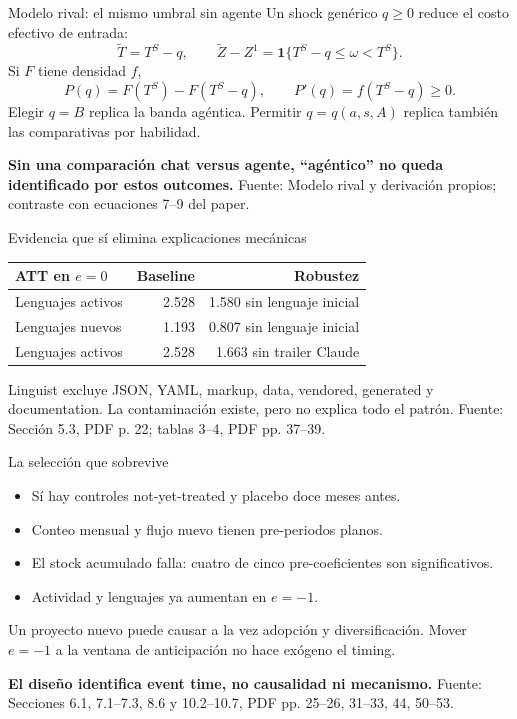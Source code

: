 \documentclass[aspectratio=169,11pt]{beamer}
\newcommand{\source}[1]{\vfill{\color{Gray}\tiny Fuente: #1}}
\newcommand{\key}[1]{{\color{Coral}\bfseries #1}}
\begin{document}
\begin{frame}{Modelo rival: el mismo umbral sin agente}
  Un shock genérico \(q\ge0\) reduce el costo efectivo de entrada:
  \[
  \widetilde T=T^S-q,
  \qquad \widetilde Z-Z^1=\mathbf1\{T^S-q\le\omega<T^S\}.
  \]
  Si \(F\) tiene densidad \(f\),
  \[
  P(q)=F(T^S)-F(T^S-q),\qquad P'(q)=f(T^S-q)\ge0.
  \]
  Elegir \(q=B\) replica la banda agéntica. Permitir \(q=q(a,s,A)\) replica también las comparativas por habilidad.

  \vspace{0.35cm}
  \key{Sin una comparación chat versus agente, “agéntico” no queda identificado por estos outcomes.}
  \source{Modelo rival y derivación propios; contraste con ecuaciones 7--9 del paper.}
\end{frame}

\begin{frame}{Evidencia que sí elimina explicaciones mecánicas}
  \centering
  \begin{tabular}{lrr}
    \toprule
    ATT en \(e=0\) & Baseline & Robustez \\
    \midrule
    Lenguajes activos & 2.528 & 1.580 sin lenguaje inicial \\
    Lenguajes nuevos & 1.193 & 0.807 sin lenguaje inicial \\
    Lenguajes activos & 2.528 & 1.663 sin trailer Claude \\
    \bottomrule
  \end{tabular}

  \vspace{0.65cm}
  Linguist excluye JSON, YAML, markup, data, vendored, generated y documentation. La contaminación existe, pero no explica todo el patrón.
  \source{Sección 5.3, PDF p. 22; tablas 3--4, PDF pp. 37--39.}
\end{frame}

\begin{frame}{La selección que sobrevive}
  \begin{itemize}
    \item Sí hay controles not-yet-treated y placebo doce meses antes.
    \item Conteo mensual y flujo nuevo tienen pre-periodos planos.
    \item El stock acumulado falla: cuatro de cinco pre-coeficientes son significativos.
    \item Actividad y lenguajes ya aumentan en \(e=-1\).
  \end{itemize}
  \vspace{0.35cm}
  Un proyecto nuevo puede causar a la vez adopción y diversificación. Mover \(e=-1\) a la ventana de anticipación no hace exógeno el timing.

  \vspace{0.35cm}
  \key{El diseño identifica event time, no causalidad ni mecanismo.}
  \source{Secciones 6.1, 7.1--7.3, 8.6 y 10.2--10.7, PDF pp. 25--26, 31--33, 44, 50--53.}
\end{frame}
\end{document}
